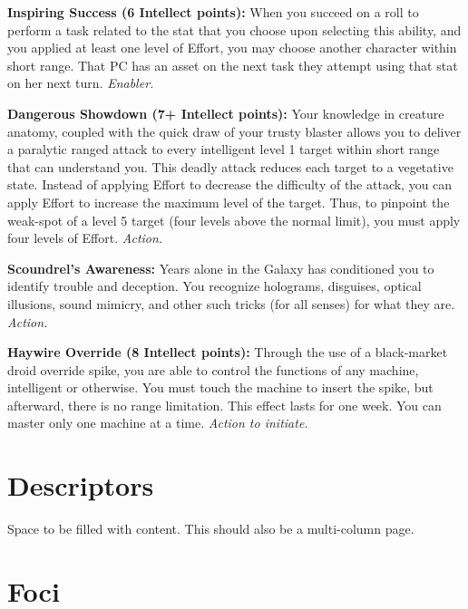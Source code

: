 \documentclass[a4paper,10pt,final,twocolumn,oneside]{book}
\newcommand{\itemAbility}[2]{\textcolor{25gray}{\textbullet\textbf{ #1:}}{ #2}\par}
\newcommand{\enabler}{\textit{ Enabler.}}
\newcommand{\action}{\textit{ Action.}}
\newcommand{\actionInit}{\textit{ Action to initiate.}}
\begin{document}
\itemAbility{Inspiring Success (6 Intellect points)}{When you succeed on a roll to perform a task related to the stat that you choose upon selecting this ability, and you applied at least one level of Effort, you may choose another character within short range. That PC has an asset on the next task they attempt using that stat on her next turn.\enabler}

\itemAbility{Dangerous Showdown (7+ Intellect points)}{Your knowledge in creature anatomy, coupled with the quick draw of your trusty blaster allows you to deliver a paralytic ranged attack to every intelligent level 1 target within short range that can understand you. This deadly attack reduces each target to a vegetative state. Instead of applying Effort to decrease the difficulty of the attack, you can apply Effort to increase the maximum level of the target. Thus, to pinpoint the weak-spot of a level 5 target (four levels above the normal limit), you must apply four levels of Effort.\action}

\itemAbility{Scoundrel's Awareness}{Years alone in the Galaxy has conditioned you to identify trouble and deception. You recognize holograms, disguises, optical illusions, sound mimicry, and other such tricks (for all senses) for what they are.\action}

\itemAbility{Haywire Override (8 Intellect points)}{ Through the use of a black-market droid override spike, you are able to control the functions of any machine, intelligent or otherwise. You must touch the machine to insert the spike, but afterward, there is no range limitation. This effect lasts for one week. You can master only one machine at a time.\actionInit}



\section{Descriptors} %
\label{sec:descriptors}

Space to be filled with content. This should also be a multi-column page.



\section{Foci} %
\label{sec:foci}
\end{document}
